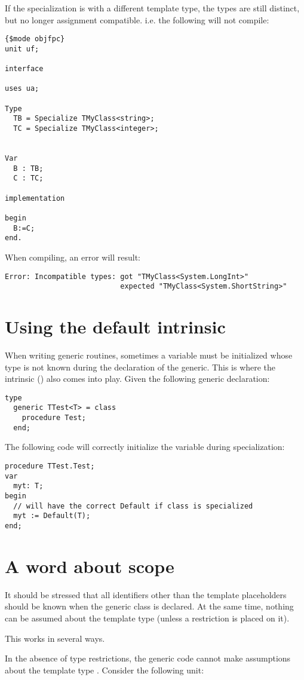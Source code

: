 If the specialization is with a different template type, the types are still distinct, but no longer assignment 
compatible. i.e. the following will not compile:
\begin{verbatim}
{$mode objfpc}
unit uf;

interface

uses ua;

Type
  TB = Specialize TMyClass<string>;
  TC = Specialize TMyClass<integer>;


Var
  B : TB;
  C : TC;
  
implementation

begin
  B:=C;
end.   
\end{verbatim}
When compiling, an error will result:
\begin{verbatim}
Error: Incompatible types: got "TMyClass<System.LongInt>"
                           expected "TMyClass<System.ShortString>"
\end{verbatim}

\section{Using the default intrinsic}
\label{se:genericdefault}
When writing generic routines, sometimes a variable must be initialized whose type is not known during the declaration of the generic.
This is where the  intrinsic () also comes into play. Given the following generic declaration:
\begin{verbatim}
type
  generic TTest<T> = class
    procedure Test;
  end;
\end{verbatim}
The following code will correctly initialize the variable  during specialization:
\begin{verbatim}
procedure TTest.Test;
var
  myt: T;
begin
  // will have the correct Default if class is specialized
  myt := Default(T); 
end;
\end{verbatim}

\section{A word about scope}
It should be stressed that all identifiers other than the template placeholders
should be known when the generic class is declared. At the same time,
nothing can be assumed about the template type (unless a restriction is
placed on it).

This works in several ways. 

In the absence of type restrictions, the generic code cannot make
assumptions about the template type . Consider the following unit:

